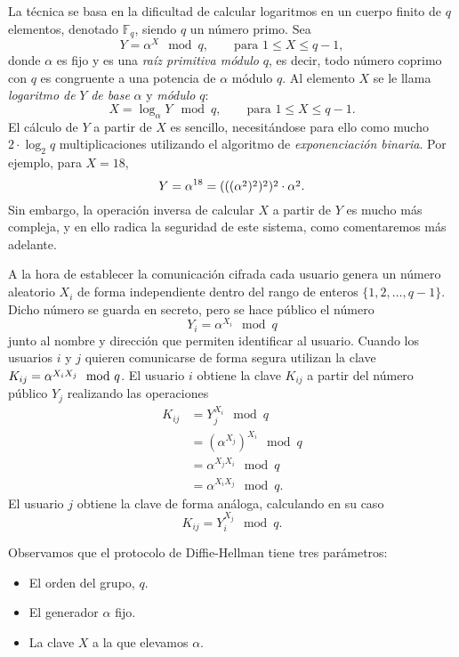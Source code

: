 \documentclass[
  a4paper,
  12pt,
  spanish,
]{scrartcl}
\begin{document}
La técnica se basa en la dificultad de calcular logaritmos en un cuerpo finito de \(q\) elementos, denotado \(\mathbb F_q\), siendo \(q\) un número primo. 
Sea \[Y = \alpha^X \mod q, \qquad \text{para } 1 \leq X \leq q - 1,\] donde \(\alpha\) es fijo y es una \textit{raíz primitiva módulo} \(q\), es decir, todo número coprimo con \(q\) es congruente a una potencia de \(\alpha\) módulo \(q\). 
Al elemento \(X\) se le llama \textit{logaritmo de} \(Y\) \textit{de base} \(\alpha\) y \textit{módulo} \(q\): \[X = \log_{\alpha} Y \mod q, \qquad \text{para } 1 \leq X \leq q - 1.\]
El cálculo de \(Y\) a partir de \(X\) es sencillo, necesitándose para ello como mucho \(2 \cdot \log_2 q\) multiplicaciones utilizando el algoritmo de \textit{exponenciación binaria}. Por ejemplo, para \(X = 18\), \[Y = \alpha^{18} = \cramped{(((\alpha^2)^2)^2)^2} \cdot \cramped{\alpha^2}.\]
Sin embargo, la operación inversa de calcular \(X\) a partir de \(Y\) es mucho más compleja, y en ello radica la seguridad de este sistema, como comentaremos más adelante.

A la hora de establecer la comunicación cifrada cada usuario genera un número aleatorio \(X_i\) de forma independiente dentro del rango de enteros \(\{1, 2, \dots, q - 1\}\). 
Dicho número se guarda en secreto, pero se hace público el número \[Y_i = \alpha^{X_i} \mod q\] junto al nombre y dirección que permiten identificar al usuario. 
Cuando los usuarios \(i\) y \(j\) quieren comunicarse de forma segura utilizan la clave \(K_{ij} = \cramped{\alpha^{X_iX_j}} \mod q\). 
El usuario \(i\) obtiene la clave \(K_{ij}\) a partir del número público \(Y_j\) realizando las operaciones \begin{align*}
  K_{ij} &= Y_j^{X_i} \mod q \\
    &= (\alpha^{X_j})^{X_i} \mod q \\
    &= \alpha^{X_jX_i} \mod q \\
    &= \alpha^{X_iX_j} \mod q.
\end{align*}
El usuario \(j\) obtiene la clave de forma análoga, calculando en su caso \[K_{ij} = Y_i^{X_j} \mod q.\]

Observamos que el protocolo de Diffie-Hellman tiene tres parámetros: \begin{itemize}
  \item El orden del grupo, \(q\).
  \item El generador \(\alpha\) fijo.
  \item La clave \(X\) a la que elevamos \(\alpha\).
\end{itemize}
\end{document}
